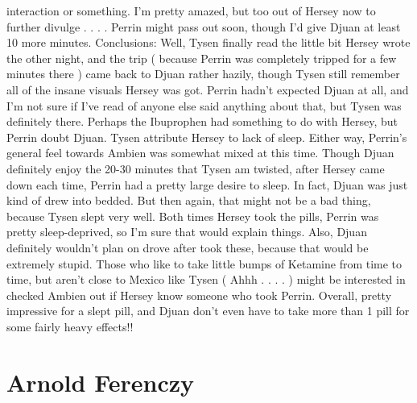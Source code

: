 \documentclass[12pt]{book}
\begin{document}
interaction or something. I'm pretty amazed, but too out of Hersey now to further divulge . . .  . Perrin might pass out soon, though I'd give Djuan at least 10 more minutes. Conclusions: Well, Tysen finally read the little bit Hersey wrote the other night, and the trip ( because Perrin was completely tripped for a few minutes there ) came back to Djuan rather hazily, though Tysen still remember all of the insane visuals Hersey was got. Perrin hadn't expected Djuan at all, and I'm not sure if I've read of anyone else said anything about that, but Tysen was definitely there. Perhaps the Ibuprophen had something to do with Hersey, but Perrin doubt Djuan. Tysen attribute Hersey to lack of sleep. Either way, Perrin's general feel towards Ambien was somewhat mixed at this time. Though Djuan definitely enjoy the 20-30 minutes that Tysen am twisted, after Hersey came down each time, Perrin had a pretty large desire to sleep. In fact, Djuan was just kind of drew into bedded. But then again, that might not be a bad thing, because Tysen slept very well. Both times Hersey took the pills, Perrin was pretty sleep-deprived, so I'm sure that would explain things. Also, Djuan definitely wouldn't plan on drove after took these, because that would be extremely stupid. Those who like to take little bumps of Ketamine from time to time, but aren't close to Mexico like Tysen ( Ahhh . . . . ) might be interested in checked Ambien out if Hersey know someone who took Perrin. Overall, pretty impressive for a slept pill, and Djuan don't even have to take more than 1 pill for some fairly heavy effects!!



\chapter{Arnold Ferenczy}
\end{document}
